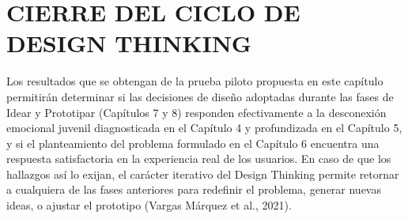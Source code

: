 \section{CIERRE DEL CICLO DE DESIGN THINKING}
Los resultados que se obtengan de la prueba piloto propuesta en este capítulo permitirán determinar si las decisiones de diseño adoptadas durante las fases de Idear y Prototipar (Capítulos 7 y 8) responden efectivamente a la desconexión emocional juvenil diagnosticada en el Capítulo 4 y profundizada en el Capítulo 5, y si el planteamiento del problema formulado en el Capítulo 6 encuentra una respuesta satisfactoria en la experiencia real de los usuarios. En caso de que los hallazgos así lo exijan, el carácter iterativo del Design Thinking permite retornar a cualquiera de las fases anteriores para redefinir el problema, generar nuevas ideas, o ajustar el prototipo (Vargas Márquez et al., 2021).